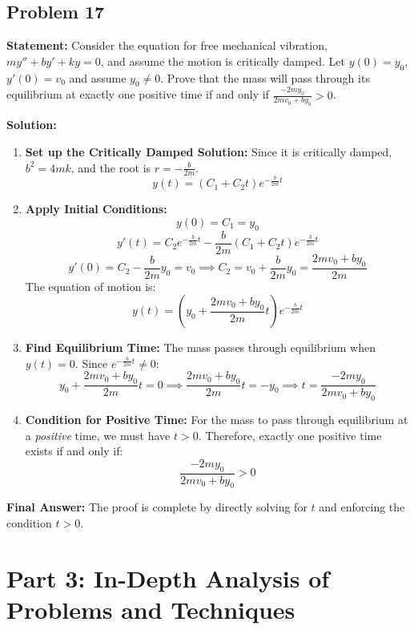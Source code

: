 \documentclass[11pt]{article}
\begin{document}
\subsection{Problem 17}
\textbf{Statement:} Consider the equation for free mechanical vibration, $my'' + by' + ky = 0$, and assume the motion is critically damped. Let $y(0) = y_0$, $y'(0) = v_0$ and assume $y_0 \neq 0$. Prove that the mass will pass through its equilibrium at exactly one positive time if and only if $\frac{-2my_0}{2mv_0 + by_0} > 0$.

\textbf{Solution:}
\begin{enumerate}
    \item \textbf{Set up the Critically Damped Solution:}
    Since it is critically damped, $b^2 = 4mk$, and the root is $r = -\frac{b}{2m}$.
    \[ y(t) = (C_1 + C_2 t)e^{-\frac{b}{2m}t} \]
    
    \item \textbf{Apply Initial Conditions:}
    \[ y(0) = C_1 = y_0 \]
    \[ y'(t) = C_2 e^{-\frac{b}{2m}t} - \frac{b}{2m}(C_1 + C_2 t)e^{-\frac{b}{2m}t} \]
    \[ y'(0) = C_2 - \frac{b}{2m}y_0 = v_0 \implies C_2 = v_0 + \frac{b}{2m}y_0 = \frac{2mv_0 + by_0}{2m} \]
    The equation of motion is:
    \[ y(t) = \left(y_0 + \frac{2mv_0 + by_0}{2m} t\right) e^{-\frac{b}{2m}t} \]
    
    \item \textbf{Find Equilibrium Time:}
    The mass passes through equilibrium when $y(t) = 0$. Since $e^{-\frac{b}{2m}t} \neq 0$:
    \[ y_0 + \frac{2mv_0 + by_0}{2m} t = 0 \implies \frac{2mv_0 + by_0}{2m} t = -y_0 \implies t = \frac{-2my_0}{2mv_0 + by_0} \]
    
    \item \textbf{Condition for Positive Time:}
    For the mass to pass through equilibrium at a \textit{positive} time, we must have $t > 0$.
    Therefore, exactly one positive time exists if and only if:
    \[ \frac{-2my_0}{2mv_0 + by_0} > 0 \]
\end{enumerate}
\textbf{Final Answer:} The proof is complete by directly solving for $t$ and enforcing the condition $t > 0$.

\newpage
\section{Part 3: In-Depth Analysis of Problems and Techniques}
\end{document}
